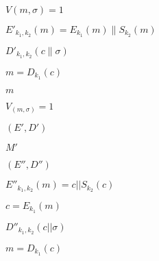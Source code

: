 \documentclass[10pt]{book}
\begin{document}
\begin{mdSnippets}
\begin{mdInlineSnippet}[1e4f52f136b79856cfe92b15f910e729]%
$V(m,\sigma)=1$\end{mdInlineSnippet}%
\begin{mdInlineSnippet}[02bc25f12702eeac15f68e7510bc2071]%
$E'_{k_1,k_2}(m)= E_{k_1}(m)\|S_{k_2}(m)$\end{mdInlineSnippet}%
\begin{mdInlineSnippet}%
$D'_{k_1,k_2}(c\|\sigma)$\end{mdInlineSnippet}%
\begin{mdInlineSnippet}[17e0cc6769a582d47c1cebfd21b62443]%
$m = D_{k_1}(c)$\end{mdInlineSnippet}%
\begin{mdInlineSnippet}[6f8f57715090da2632453988d9a1501b]%
$m$\end{mdInlineSnippet}%
\begin{mdInlineSnippet}[425f54b81df3729e5ac0202cbcdbe859]%
$V_(m,\sigma)=1$\end{mdInlineSnippet}%
\begin{mdInlineSnippet}%
$(E',D')$\end{mdInlineSnippet}%
\begin{mdInlineSnippet}[c0c8156de7a5455113e67f33c15182fb]%
$M'$\end{mdInlineSnippet}%
\begin{mdInlineSnippet}[bf1c3f008617dc19e2a47ac023e09625]%
$(E'',D'')$\end{mdInlineSnippet}%
\begin{mdInlineSnippet}[4f45b8bd3922878e2175cc6bdec1852d]%
$E''_{k_1,k_2}(m) = c || S_{k_2}(c)$\end{mdInlineSnippet}%
\begin{mdInlineSnippet}[e5b344f85774d5bdd995e590a71e6e16]%
$c = E_{k_1}(m)$\end{mdInlineSnippet}%
\begin{mdInlineSnippet}%
$D''_{k_1,k_2}(c || \sigma)$\end{mdInlineSnippet}%
\begin{mdInlineSnippet}[17e0cc6769a582d47c1cebfd21b62443]%
$m = D_{k_1}(c)$\end{mdInlineSnippet}%

\end{mdSnippets}
\end{document}
